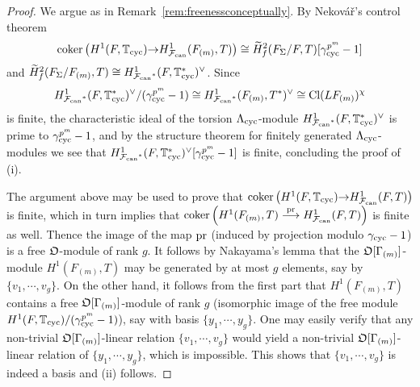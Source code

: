 \documentclass[12pt]{amsart}
\numberwithin{equation}{section}
\begin{document}
\begin{proof}
We argue as in Remark~\ref{rem:freenessconceptually}. By Nekov\'a\v{r}'s control theorem  
$$\textup{coker}\left(H^1(F,{\mathbb{T}}_{\textup{cyc}}){\rightarrow} H^1_{\mathcal{F}_{\textup{\lowercase{can}}}}(F_{(m)},T)\right)\cong \widetilde{H}^2_f(F_\Sigma/F,T)[\gamma^{p^m}_{\textup{cyc}}-1]$$
and $ \widetilde{H}^2_f(F_\Sigma/F_{(m)},T)\cong H^1_{{\mathcal{F}_{\textup{\lowercase{can}}}}^*}(F,{\mathbb{T}}_{\textup{cyc}}^*)^\vee$. Since 
$$H^1_{{\mathcal{F}_{\textup{\lowercase{can}}}}^*}(F,{\mathbb{T}}_{\textup{cyc}}^*)^\vee/(\gamma^{p^m}_{\textup{cyc}}-1) \cong H^1_{{\mathcal{F}_{\textup{\lowercase{can}}}}^*}(F_{(m)},T^*)^\vee\cong \textup{Cl}(LF_{(m)})^\chi$$
is finite, the characteristic ideal of the torsion ${\Lambda}_{\textup{cyc}}$-module $H^1_{{\mathcal{F}_{\textup{\lowercase{can}}}}^*}(F,{\mathbb{T}}_{\textup{cyc}}^*)^\vee$ is prime to $\gamma^{p^m}_{\textup{cyc}}-1$, and by the structure theorem for finitely generated ${\Lambda}_{\textup{cyc}}$-modules we see that $H^1_{{\mathcal{F}_{\textup{\lowercase{can}}}}^*}(F,{\mathbb{T}}_{\textup{cyc}}^*)^\vee[\gamma^{p^m}_{\textup{cyc}}-1]$ is finite, concluding the proof of (i). 

The argument above may be used to prove that $\textup{coker}\left(H^1(F,{\mathbb{T}}_{\textup{cyc}}){\rightarrow} H^1_{\mathcal{F}_{\textup{\lowercase{can}}}}(F,T)\right)$ is finite, which in turn implies that $\textup{coker}\left(H^1(F_{(m)},T)\stackrel{\textup{pr}}{\longrightarrow} H^1_{\mathcal{F}_{\textup{\lowercase{can}}}}(F,T)\right)$ is finite as well. Thence the image of the map $\textup{pr}$
(induced by projection modulo $\gamma_{\textup{cyc}}-1$) is a free ${\frak{O}}$-module of rank $g$. It follows by Nakayama's lemma that the ${\frak{O}}[\Gamma_{(m)}]$-module $H^1(F_{(m)},T)$ may be generated by at most $g$ elements, say by $\{v_1,\cdots,v_g\}$. On the other hand, it follows from the first part that $H^1(F_{(m)},T)$ contains a free ${\frak{O}}[\Gamma_{(m)}]$-module of rank $g$ (isomorphic image of the free module $H^1(F,{\mathbb{T}}_{\textup{cyc}})/(\gamma_{\textup{cyc}}^{p^m}-1)$), say with basis $\{y_1,\cdots,y_g\}$. One may easily verify that any non-trivial   ${\frak{O}}[\Gamma_{(m)}]$-linear relation $\{v_1,\cdots,v_g\}$ would yield a non-trivial  ${\frak{O}}[\Gamma_{(m)}]$-linear relation of $\{y_1,\cdots,y_g\}$, which is impossible. This shows that $\{v_1,\cdots,v_g\}$ is indeed a basis and (ii) follows. 


\end{proof}
\end{document}

